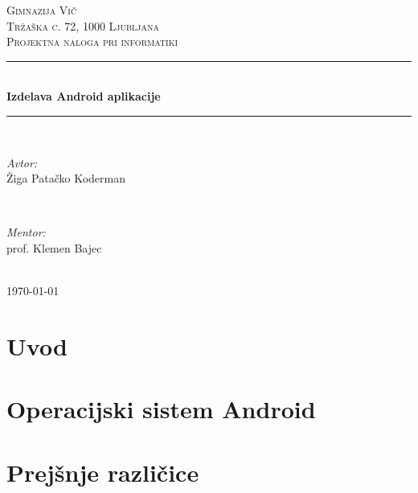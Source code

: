 \documentclass[a4paper, 12pt]{article}
\begin{document}
\begin{titlepage}
	\newcommand{\HRule}{\rule{\linewidth}{0.5mm}}
	\center

	\textsc{\LARGE Gimnazija Vič}\\[0.5cm]
	\textsc{\Large Tržaška c. 72, 1000 Ljubljana}\\[1.5cm]
	\textsc{Projektna naloga pri informatiki}\\[0.2cm]

	\HRule \\[0.4cm]
	{ \huge \bfseries Izdelava Android aplikacije}\\[0.4cm]
	\HRule \\[1.5cm]

	\begin{minipage}{0.4\textwidth}
		\begin{flushleft} \large
			\emph{Avtor:}\\
			Žiga Patačko Koderman
		\end{flushleft}
	\end{minipage}
	~
	\begin{minipage}{0.4\textwidth}
		\begin{flushright} \large
			\emph{Mentor:} \\
			prof. Klemen Bajec
		\end{flushright}
		\end{minipage}\\[4cm]

		{\large \today}\\[3cm]

		\vfill
	\end{titlepage}

	

	\pagebreak

	\tableofcontents
	\pagebreak

	\section{Uvod}
	
  \pagebreak

	\section{Operacijski sistem Android}
	
	\clearpage

	\section{Prejšnje različice}
	
  \pagebreak
\end{document}
